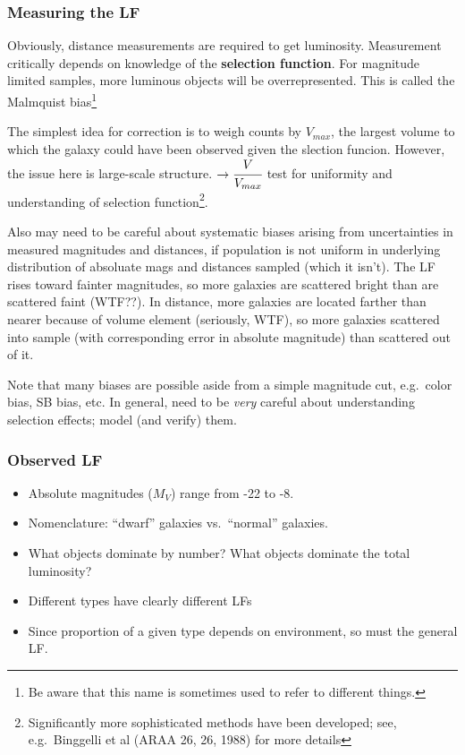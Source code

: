 \documentclass{article}
\newcommand{\mynotes}[1]{\textcolor{cadmiumorange}{#1}}
\begin{document}
\subsubsection{Measuring the LF}
Obviously, distance measurements are required to get luminosity.
Measurement critically depends on knowledge of the \textbf{selection function}.
For magnitude limited samples, more luminous objects will be overrepresented.
This is called the Malmquist bias\footnote{Be aware that this name is sometimes
used to refer to different things.}

The simplest idea for correction is to weigh counts by $V_{max}$, the largest
volume to which the galaxy could have been observed given the slection funcion.
However, the issue here is large-scale structure.
$\rightarrow \cfrac{V}{V_{max}}$ test for uniformity and understanding of
selection function\footnote{Significantly more sophisticated methods have
been developed; see, e.g.\ Binggelli et al (ARAA 26, 26, 1988) for
more details}.

Also may need to be careful about systematic biases arising from uncertainties
in measured magnitudes and distances, if population is not uniform in
underlying distribution of absoluate mags and distances sampled (which it
isn't).  The LF rises toward fainter magnitudes, so more galaxies are scattered
bright than are scattered faint \mynotes{(WTF??)}.  In distance, more galaxies
are located farther than nearer because of volume element \mynotes{(seriously,
WTF)}, so more galaxies scattered into sample (with corresponding error in
absolute magnitude) than scattered out of it.

Note that many biases are possible aside from a simple magnitude cut, e.g.\
color bias, SB bias, etc. In general, need to be \emph{very} careful about
understanding selection effects; model (and verify) them.

\subsubsection{Observed LF}
\begin{itemize}
    \item Absolute magnitudes ($M_{V}$) range from -22 to -8.
    \item Nomenclature: ``dwarf'' galaxies vs.\ ``normal'' galaxies.
    \item What objects dominate by number? What objects dominate the
        total luminosity?
    \item Different types have clearly different LFs
    \item Since proportion of a given type depends on environment, so
        must the general LF.
\end{itemize}
\end{document}
